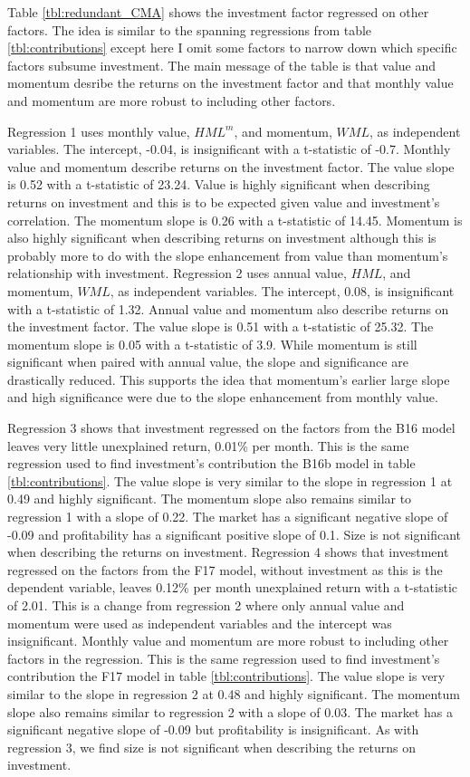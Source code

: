 
Table \ref{tbl:redundant_CMA} shows the investment factor regressed on other
factors.
The idea is similar to the spanning regressions from table
\ref{tbl:contributions} except here I omit some factors to narrow down which
specific factors subsume investment.
The main message of the table is that value and momentum desribe the returns on
the investment factor and that monthly value and momentum are more robust to
including other factors.

Regression 1 uses monthly value, $HML^m$, and momentum, $WML$, as independent
variables.
The intercept, -0.04, is insignificant with a t-statistic of -0.7.
Monthly value and momentum describe returns on the investment factor.
The value slope is 0.52 with a t-statistic of 23.24.
Value is highly significant when describing returns on investment and this is
to be expected given value and investment's correlation.
The momentum slope is 0.26 with a t-statistic of 14.45.
Momentum is also highly significant when describing returns on investment
although this is probably more to do with the slope enhancement from value than
momentum's relationship with investment.
Regression 2 uses annual value, $HML$, and momentum, $WML$, as independent
variables.
The intercept, 0.08, is insignificant with a t-statistic of 1.32.
Annual value and momentum also describe returns on the investment factor.
The value slope is 0.51 with a t-statistic of 25.32.
The momentum slope is 0.05 with a t-statistic of 3.9.
While momentum is still significant when paired with annual value,
the slope and significance are drastically reduced.
This supports the idea that momentum's earlier large slope and high
significance were due to the slope enhancement from monthly value.

Regression 3 shows that investment regressed on the factors from the B16 model
leaves very little unexplained return, 0.01\% per month.
This is the same regression used to find investment's contribution the B16b
model in table \ref{tbl:contributions}.
The value slope is very similar to the slope in regression 1 at 0.49 and highly
significant.
The momentum slope also remains similar to regression 1 with a slope of 0.22.
The market has a significant negative slope of -0.09 and
profitability has a significant positive slope of 0.1.
Size is not significant when describing the returns on investment.
Regression 4 shows that investment regressed on the factors from the F17 model,
without investment as this is the dependent variable,
leaves 0.12\% per month unexplained return with a t-statistic of 2.01.
This is a change from regression 2 where only annual value and momentum were
used as independent variables and the intercept was insignificant.
Monthly value and momentum are more robust to including other factors in the
regression.
This is the same regression used to find investment's contribution the F17
model in table \ref{tbl:contributions}.
The value slope is very similar to the slope in regression 2 at 0.48 and highly
significant.
The momentum slope also remains similar to regression 2 with a slope of 0.03.
The market has a significant negative slope of -0.09 but
profitability is insignificant.
As with regression 3, we find size is not significant when describing the
returns on investment.

